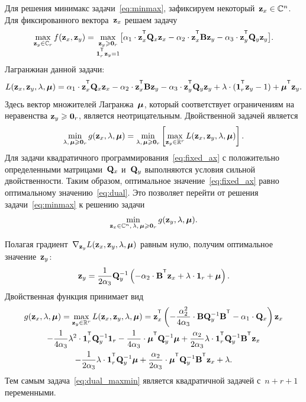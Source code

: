 Для решения минимакс задачи~\eqref{eq:minmax}, зафиксируем некоторый~$\mathbf{z}_x \in \mathbb{C}^n$. Для фиксированного вектора~$\mathbf{z}_x$ решаем задачу
\begin{equation}
\max_{\bz_y \in \mathbb{C}_r} f(\bz_x, \bz_y) = \max_{\substack{\bz_y \geq \bZero_r \\ \bOne_r^{\T}\bz_y=1}} \bigl[\alpha_1 \cdot \bz_x^{\T} \bQ_x \bz_x - \alpha_2 \cdot \bz_x^{\T} \bB \bz_y - \alpha_3 \cdot \bz_y^{\T} \bQ_y \bz_y \bigr].
\label{eq:fixed_ax}
\end{equation}
Лагранжиан данной задачи:
\begin{equation*}
L(\bz_x, \bz_y, \lambda, \bmu) = \alpha_1 \cdot \bz_x^{\T} \bQ_x \bz_x - \alpha_2 \cdot \bz_x^{\T} \bB \bz_y - \alpha_3 \cdot \bz_y^{\T} \bQ_y \bz_y + \lambda \cdot  (\bOne_r^{\T} \bz_y - 1) + \bmu^{\T} \bz_y.
\end{equation*}
Здесь вектор множителей Лагранжа~$\boldsymbol{\mu}$, который соответствует ограничениям на неравенства $\mathbf{z}_y \geqslant \boldsymbol{0}_r$, является неотрицательным.
Двойственной задачей является
\begin{equation}
\min_{\lambda, \, \boldsymbol{\mu} \geqslant \boldsymbol{0}_r} g(\mathbf{z}_x, \lambda, \boldsymbol{\mu}) = \min_{\lambda, \, \boldsymbol{\mu} \geqslant \boldsymbol{0}_r}  \left[\max_{\mathbf{z}_y \in \mathbb{R}^r} L(\mathbf{z}_x, \mathbf{z}_y, \lambda, \boldsymbol{\mu}) \right].
\label{eq:dual}
\end{equation}
Для задачи квадратичного программирования~\eqref{eq:fixed_ax} с положительно определенными матрицами~$\mathbf{Q}_x$ и~$\mathbf{Q}_y$ выполняются условия сильной двойственности. Таким образом, оптимальное значение~\eqref{eq:fixed_ax} равно оптимальному значению~\eqref{eq:dual}. Это позволяет перейти от решения задачи~\eqref{eq:minmax} к решению задачи
\begin{equation}
\min_{\mathbf{z}_x \in \mathbb{C}^n, \, \lambda, \, \boldsymbol{\mu} \geqslant \boldsymbol{0}_r} g(\mathbf{z}_y, \lambda, \boldsymbol{\mu}).
\label{eq:dual_maxmin}
\end{equation}

Полагая градиент~$\nabla_{\mathbf{z}_y} L(\mathbf{z}_x, \mathbf{z}_y, \lambda, \boldsymbol{\mu})$ равным нулю, получим оптимальное значение~$\mathbf{z}_y$:
\begin{equation}
\bz_y = \frac{1}{2\alpha_3} \bQ_y^{-1} \left( - \alpha_2 \cdot \bB^{\T} \bz_x +\lambda \cdot \bOne_r + \bmu \right).
\label{eq:ax}
\end{equation}
Двойственная функция принимает вид
\begin{multline}
g(\bz_x, \lambda, \bmu)
= \max_{\bz_y \in \bbR^r} L(\bz_x, \bz_y, \lambda, \bmu) =
\bz_x^{\T} \left( - \frac{\alpha_2^2}{4\alpha_3} \cdot \bB \bQ_y^{-1} \bB^{\T} - \alpha_1 \cdot \bQ_x\right) \bz_x \\ - \frac{1}{4 \alpha_3} \lambda^2 \cdot \bOne_r^{\T} \bQ_y^{-1} \bOne_r - \frac{1}{4 \alpha_3} \cdot \bmu^{\T} \bQ_y^{-1} \bmu + \frac{\alpha_2}{2 \alpha_3} \lambda \cdot \bOne_r^{\T} \bQ_y^{-1} \bB^{\T} \bz_x \\ - \frac{1}{2 \alpha_3} \lambda \cdot \bOne_r^{\T} \bQ_y^{-1} \bmu + \frac{\alpha_2}{2 \alpha_3} \cdot \bmu^{\T} \bQ_y^{-1} \bB^{\T} \bz_x + \lambda.
\label{eq:dual_quadratic_form}
\end{multline}
Тем самым задача~\eqref{eq:dual_maxmin} является квадратичной задачей с~$n + r + 1$ переменными.

